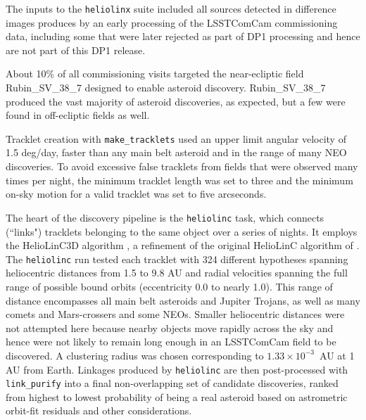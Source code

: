 The inputs to the {\tt heliolinx} suite included all sources detected in difference images produces by an early processing of the LSSTComCam commissioning data,  including some that were later rejected as part of DP1 processing and hence are not part of this DP1 release. 

About 10\% of all commissioning visits targeted the near-ecliptic field Rubin\_SV\_38\_7 designed to enable asteroid discovery. 
Rubin\_SV\_38\_7 produced the vast majority of asteroid discoveries, as expected, but a few were found in off-ecliptic fields as well. 

Tracklet creation with {\tt make\_tracklets} used an upper limit angular velocity of 1.5 deg/day, faster than any main belt asteroid and in the range of many NEO discoveries. 
To avoid excessive false tracklets from fields that were observed many times per night, the minimum tracklet length was set to three and the minimum on-sky motion for a valid tracklet was set to five arcseconds. 

The heart of the discovery pipeline is the {\tt heliolinc} task, which connects (``links") tracklets belonging to the same object over a series of nights.
It employs the HelioLinC3D algorithm \citep{2020DPS....5221101E,2022DPS....5450404H}, a refinement of the original HelioLinC algorithm of \citet{2018AJ....156..135H}.
The {\tt heliolinc} run tested each tracklet with 324 different hypotheses spanning heliocentric distances from 1.5 to 9.8 AU and radial velocities spanning the full range of possible bound orbits (eccentricity 0.0 to nearly 1.0). 
This range of distance encompasses all main belt asteroids and Jupiter Trojans, as well as many comets and Mars-crossers and some NEOs. 
Smaller heliocentric distances were not attempted here because nearby objects move rapidly across the sky and hence were not likely to remain long enough in an LSSTComCam field to be discovered. 
A clustering radius was chosen corresponding to $1.33 \times 10^{-3}$~AU at 1 AU from Earth. Linkages produced by {\tt heliolinc} are then post-processed with {\tt link\_purify} into a final non-overlapping set of candidate discoveries, ranked from highest to lowest probability of being a real asteroid based on astrometric orbit-fit residuals and other considerations.
